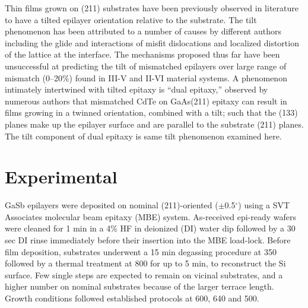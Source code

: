 Thin films grown on (211) substrates have been previously observed in literature to have a tilted epilayer orientation relative to the substrate\cite{Zhao2011,Wang2006,Dhar1997a,Lange1991,Nakamura1992}.
The tilt phenomenon has been attributed to a number of causes by different authors including the glide and interactions of misfit dislocations \cite{Olsen1975,Riesz1994,Ayers1991,Johnson2011} and localized distortion of the lattice at the interface\cite{Sasaki1992}.
The mechanisms proposed thus far have been unsuccessful at predicting the tilt of mismatched epilayers over large range of mismatch (0--20\%) found in III-V and II-VI material systems.
A phenomenon intimately intertwined with tilted epitaxy is ``dual epitaxy,'' observed by numerous authors\cite{Li1995a,Nakamura1992,Rujirawat1998,Lange1991} that mismatched CdTe on GaAs(211) epitaxy can result in films growing in a twinned orientation, combined with a tilt; such that the (133) planes make up the epilayer surface and are parallel to the substrate (211) planes.
The tilt component of dual epitaxy is same tilt phenomenon examined here.

\section{Experimental}
GaSb epilayers were deposited on nominal (211)-oriented (\(\pm\)0.5\(^\circ\)) using a SVT Associates molecular beam epitaxy (MBE) system.
As-received epi-ready wafers were cleaned for 1 min in a 4\% HF in deionized (DI) water dip followed by a 30 sec DI rinse immediately before their insertion into the MBE load-lock.
Before film deposition, substrates underwent a 15 min degassing procedure at 350\celsius{} followed by a thermal treatment at 800\celsius{} for up to 5 min, to reconstruct the Si surface.
Few single steps are expected to remain on vicinal substrates, and a higher number on nominal substrates because of the larger terrace length.
Growth conditions followed established protocols\cite{Akahane2004,Balakrishnan2006a,Fischer1986} at 600, 640 and 500\celsius.


